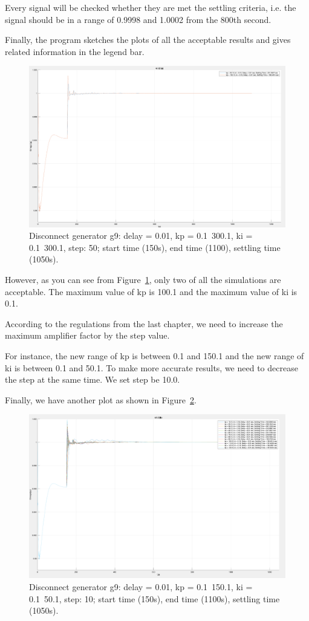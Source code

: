 Every signal will be checked whether they are met the settling criteria, i.e. the signal should be in a range of 0.9998 and 1.0002 from the 800th second. 

Finally, the program sketches the plots of all the acceptable results and gives related information in the legend bar.  

\begin{figure}[htbp]
\centering
\includegraphics[width = .819\textwidth]{figure/4_1_2_a.png}
\caption{Disconnect generator g9: delay = 0.01, kp = 0.1~300.1, ki = 0.1~300.1, step: 50; start time (150s), end time (1100), settling time (1050s).}
\label{4_1_2_a}
\end{figure}

However, as you can see from Figure~\ref{4_1_2_a}, only two of all the simulations are acceptable. The maximum value of kp is 100.1 and the maximum value of ki is 0.1.  

According to the regulations from the last chapter, we need to increase the maximum amplifier factor by the step value.  

For instance, the new range of kp is between 0.1 and 150.1 and the new range of ki is between 0.1 and 50.1. To make more accurate results, we need to decrease the step at the same time. We set step be 10.0.  

Finally, we have another plot as shown in Figure~\ref{4_1_2_b}.  

\begin{figure}[htbp]
\centering
\includegraphics[width = .819\textwidth]{figure/4_1_2_b.png}
\caption{Disconnect generator g9: delay = 0.01, kp = 0.1~150.1, ki = 0.1~50.1, step: 10; start time (150s), end time (1100s), settling time (1050s).}
\label{4_1_2_b}
\end{figure}


